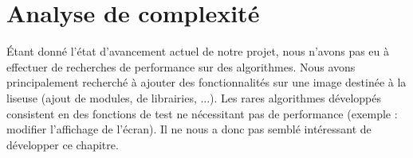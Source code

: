\chapter{Analyse de complexité}

Étant donné l'état d'avancement actuel de notre projet, nous n'avons pas eu à effectuer de recherches de performance sur des algorithmes. Nous avons principalement recherché à ajouter des fonctionnalités sur une image destinée à la liseuse (ajout de modules, de librairies, ...). Les rares algorithmes développés consistent en des fonctions de test ne nécessitant pas de performance (exemple : modifier l'affichage de l'écran). Il ne nous a donc pas semblé intéressant de développer ce chapitre.